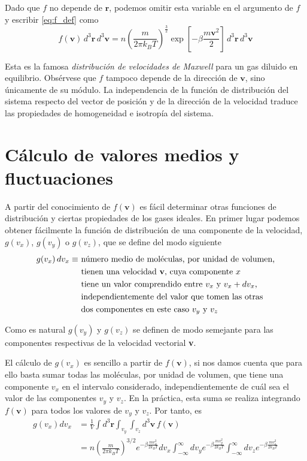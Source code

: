 Dado que $f$ no depende de $\mathbf{r}$, podemos omitir esta variable en el argumento de $f$ y escribir \eqref{eq:f_def} como
\begin{equation}\label{eq:Maxw}
f(\mathbf{v}) \, d^3 \mathbf{r} \, d^3 \mathbf{v} = n \left( \frac{m}{2\pi k_B T} \right) ^{\frac{3}{2}} \exp \left[ -\beta\frac{m\mathbf{v}^2}{2} \right] \, d^3 \mathbf{r} \, d^3 \mathbf{v}
\end{equation}

Esta es la famosa \emph{distribución de velocidades de Maxwell} para un gas diluido en equilibrio.
Obsérvese que $f$ tampoco depende de la dirección de $\mathbf{v}$, sino únicamente de su módulo.
La independencia de la función de distribución del sistema respecto del vector de posición y de la dirección de la velocidad traduce las propiedades de homogeneidad e isotropía del sistema.

\section{Cálculo de valores medios y fluctuaciones}

A partir del conocimiento de $f(\mathbf{v})$ es fácil determinar otras funciones de distribución y ciertas propiedades de los gases ideales. En primer lugar podemos obtener fácilmente la función de distribución de una componente de la velocidad, $g(v_x)$, $g(v_y)$ o $g(v_z)$, que se define del modo siguiente
\begin{align}
	g(v_x) \, dv_x \equiv & \text{ número medio de moléculas, por unidad de volumen,} \nonumber \\
		& \text{ tienen una velocidad \textbf{v}, cuya componente $x$ } \nonumber\\
		& \text{ tiene un valor comprendido entre $v_x$ y $v_x + dv_x$, }  \\
		& \text{ independientemente del valor que tomen las otras } \nonumber \\
		& \text{ dos componentes en este caso $v_y$ y $v_z$} \nonumber
\end{align}

Como es natural $g(v_y)$ y $g(v_z)$ se definen de modo semejante para las componentes respectivas de la velocidad vectorial \textbf{v}.

El cálculo de $g(v_x)$ es sencillo a partir de $f(\mathbf{v})$, si nos damos cuenta que para ello basta sumar todas las moléculas, por unidad de volumen, que tiene una componente $v_x$ en el intervalo considerado, independientemente de cuál sea el valor de las componentes $v_y$ y $v_z$.
En la práctica, esta suma se realiza integrando $f(\mathbf{v})$ para todos los valores de $v_y$ y $v_z$.
Por tanto, es
\begin{align}
	g(v_x)dv_x &= \frac{1}{V} \int d^3 \mathbf{r} \int_{v_y} \int_{v_z} d^3 \mathbf{v} \, f(\mathbf{v}) \nonumber \\
			   &= n \left( \frac{m}{2\pi k_B T} \right) ^{3/2} e^{-\beta\frac{mv_x^2}{2 k_B T}} dv_x \int_{-\infty}^{\infty} dv_y e^{-\beta\frac{mv_y^2}{2 k_B T}} \int_{-\infty}^{\infty} dv_z e^{-\beta\frac{mv_z^2}{2 k_B T}}
\end{align}

